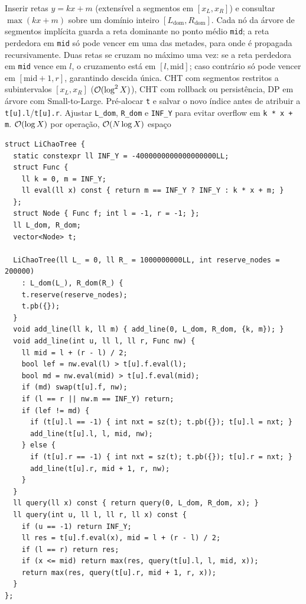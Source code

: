 \algobox
  {Inserir retas $y = kx + m$ (extensível a segmentos em $[x_L, x_R]$) e consultar $\max(kx + m)$ sobre um domínio inteiro $[L_{\text{dom}}, R_{\text{dom}}]$.}
  {Cada nó da árvore de segmentos implícita guarda a reta dominante no ponto médio \texttt{mid}; a reta perdedora em \texttt{mid} só pode vencer em uma das metades, para onde é propagada recursivamente.}
  {Duas retas se cruzam no máximo uma vez: se a reta perdedora em \texttt{mid} vence em $l$, o cruzamento está em $[l, \text{mid}]$; caso contrário só pode vencer em $[\text{mid}+1, r]$, garantindo descida única.}
  {CHT com segmentos restritos a subintervalos $[x_L, x_R]$ ($\mathcal{O}(\log^2 X)$), CHT com rollback ou persistência, DP em árvore com Small-to-Large.}
  {Pré-alocar \texttt{t} e salvar o novo índice antes de atribuir a \texttt{t[u].l}/\texttt{t[u].r}. Ajustar \texttt{L\_dom}, \texttt{R\_dom} e \texttt{INF\_Y} para evitar overflow em \texttt{k * x + m}.}
  {$\mathcal{O}(\log X)$ por operação, $\mathcal{O}(N \log X)$ espaço}

\begin{lstlisting}
struct LiChaoTree {
  static constexpr ll INF_Y = -4000000000000000000LL;
  struct Func {
    ll k = 0, m = INF_Y;
    ll eval(ll x) const { return m == INF_Y ? INF_Y : k * x + m; }
  };
  struct Node { Func f; int l = -1, r = -1; };
  ll L_dom, R_dom;
  vector<Node> t;

  LiChaoTree(ll L_ = 0, ll R_ = 1000000000LL, int reserve_nodes = 200000)
    : L_dom(L_), R_dom(R_) {
    t.reserve(reserve_nodes);
    t.pb({});
  }
  void add_line(ll k, ll m) { add_line(0, L_dom, R_dom, {k, m}); }
  void add_line(int u, ll l, ll r, Func nw) {
    ll mid = l + (r - l) / 2;
    bool lef = nw.eval(l) > t[u].f.eval(l);
    bool md = nw.eval(mid) > t[u].f.eval(mid);
    if (md) swap(t[u].f, nw);
    if (l == r || nw.m == INF_Y) return;
    if (lef != md) {
      if (t[u].l == -1) { int nxt = sz(t); t.pb({}); t[u].l = nxt; }
      add_line(t[u].l, l, mid, nw);
    } else {
      if (t[u].r == -1) { int nxt = sz(t); t.pb({}); t[u].r = nxt; }
      add_line(t[u].r, mid + 1, r, nw);
    }
  }
  ll query(ll x) const { return query(0, L_dom, R_dom, x); }
  ll query(int u, ll l, ll r, ll x) const {
    if (u == -1) return INF_Y;
    ll res = t[u].f.eval(x), mid = l + (r - l) / 2;
    if (l == r) return res;
    if (x <= mid) return max(res, query(t[u].l, l, mid, x));
    return max(res, query(t[u].r, mid + 1, r, x));
  }
};
\end{lstlisting}

